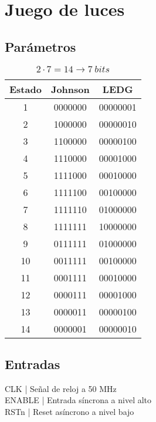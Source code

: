 \documentclass{article}
\newcommand{\iconpath}{/home/khz/git/tabler-icons/icons/outline-white/}
\newcommand{\icon}[1]{}
\begin{document}
\newpage
\section{Juego de luces}
\subsection{Parámetros}
\begin{table}[h]
    \centering
    \renewcommand{\arraystretch}{1.3}
    \begin{tabular}{|c|c|c|}
        \hline
        Estado & Johnson & LEDG \\
        \hline
        1  & 0000000 & 00000001 \\
        2  & \textcolor{c1}{1}000000 & 00000010 \\
        3  & \textcolor{c1}{11}00000 & 00000100 \\
        4  & \textcolor{c1}{111}0000 & 00001000 \\
        5  & \textcolor{c1}{1111}000 & 00010000 \\
        6  & \textcolor{c1}{11111}00 & 00100000 \\
        7  & \textcolor{c1}{111111}0 & 01000000 \\
        8  & \textcolor{c1}{1111111} & 10000000 \\
        9  & 0\textcolor{c1}{111111} & 01000000 \\
        10  & 00\textcolor{c1}{11111} & 00100000 \\
        11 & 000\textcolor{c1}{1111} & 00010000 \\
        12 & 0000\textcolor{c1}{111} & 00001000 \\
        13 & 00000\textcolor{c1}{11} & 00000100 \\
        14 & 000000\textcolor{c1}{1}& 00000010 \\
        \hline
    \end{tabular}
    \caption{$2 \cdot 7 = 14 \to 7 \ bits$}
    \label{tab:contador_johnson}
\end{table}
\subsection{Entradas}
\icon{clock} \icon{s-turn-up} CLK | Señal de reloj a 50 MHz \\
\icon{clock} \icon{s-turn-up} ENABLE | Entrada síncrona a nivel alto \\
\icon{clock-off} \icon{s-turn-down} RSTn | Reset asíncrono a nivel bajo \\
\end{document}
